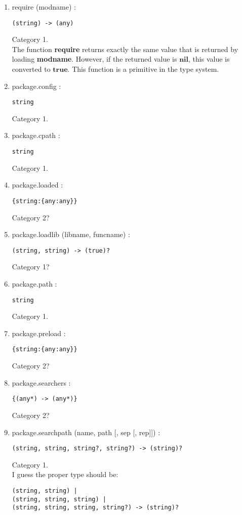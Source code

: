 \documentclass{paper}
\newcommand{\Nil}{\mathbf{nil}}
\newcommand{\True}{\mathbf{true}}
\begin{document}
\begin{enumerate}
\item require (modname) :
\begin{verbatim}
(string) -> (any)
\end{verbatim}
Category 1.
\\
The function \textbf{require} returns exactly the same value that is
returned by loading \textbf{modname}.
However, if the returned value is $\Nil$, this value is
converted to $\True$.
This function is a primitive in the type system.
\item package.config :
\begin{verbatim}
string
\end{verbatim}
Category 1.
\item package.cpath :
\begin{verbatim}
string
\end{verbatim}
Category 1.
\item package.loaded :
\begin{verbatim}
{string:{any:any}}
\end{verbatim}
Category 2?
\item package.loadlib (libname, funcname) :
\begin{verbatim}
(string, string) -> (true)?
\end{verbatim}
Category 1?
\item package.path :
\begin{verbatim}
string
\end{verbatim}
Category 1.
\item package.preload :
\begin{verbatim}
{string:{any:any}}
\end{verbatim}
Category 2?
\item package.searchers :
\begin{verbatim}
{(any*) -> (any*)}
\end{verbatim}
Category 2?
\item package.searchpath (name, path [, sep [, rep]]) :
\begin{verbatim}
(string, string, string?, string?) -> (string)?
\end{verbatim}
Category 1.
\\
I guess the proper type should be:
\begin{verbatim}
(string, string) |
(string, string, string) |
(string, string, string, string?) -> (string)?
\end{verbatim}
\end{enumerate}
\end{document}
